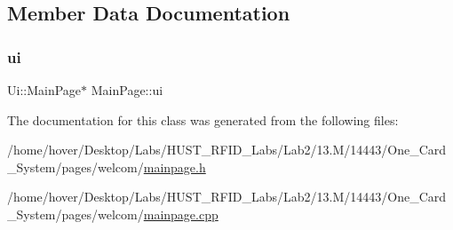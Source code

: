 \subsection{Member Data Documentation}
\mbox{\label{class_main_page_a06cf83c45e3c018adf7409c4a296d9f4}} 
\subsubsection{\texorpdfstring{ui}{ui}}
{\footnotesize\ttfamily Ui\+::\+Main\+Page$\ast$ Main\+Page\+::ui\hspace{0.3cm}{\ttfamily [private]}}



The documentation for this class was generated from the following files\+:\begin{DoxyCompactItemize}
\item 
/home/hover/\+Desktop/\+Labs/\+H\+U\+S\+T\+\_\+\+R\+F\+I\+D\+\_\+\+Labs/\+Lab2/13.\+M/14443/\+One\+\_\+\+Card\+\_\+\+System/pages/welcom/\mbox{\hyperlink{mainpage_8h}{mainpage.\+h}}\item 
/home/hover/\+Desktop/\+Labs/\+H\+U\+S\+T\+\_\+\+R\+F\+I\+D\+\_\+\+Labs/\+Lab2/13.\+M/14443/\+One\+\_\+\+Card\+\_\+\+System/pages/welcom/\mbox{\hyperlink{mainpage_8cpp}{mainpage.\+cpp}}\end{DoxyCompactItemize}
